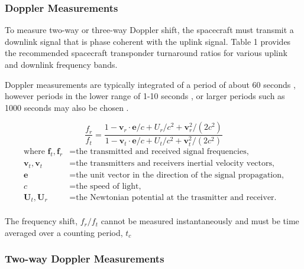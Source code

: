 \subsubsection{Doppler Measurements}

To measure two-way or three-way Doppler shift, the spacecraft must transmit a
downlink signal that is phase coherent with the uplink signal. Table 1 provides
the recommended spacecraft transponder turnaround ratios for various uplink and
downlink frequency bands.

Doppler measurements are typically integrated of a period of about 60 seconds \cite{},
however periods in the lower range of 1-10 seconds \cite{}, or larger periods such as
1000 seconds may also be chosen \cite{}.

\begin{equation}
    \frac{f_r}{f_t} = \frac{
        1-\mathbf{v}_r\cdot{}\mathbf{e}/c + U_r/c^2 +\mathbf{v}_r^2/(2c^2)
    }{
        1-\mathbf{v}_t\cdot{}\mathbf{e}/c + U_t/c^2 +\mathbf{v}_t^2/(2c^2)
    }
\end{equation}
\begin{equation*}
    \begin{aligned}
        \textrm{where  }
        \mathbf{f}_t, \mathbf{f}_r &= \textrm{the transmitted and received signal frequencies,}\\
        \mathbf{v}_t, \mathbf{v}_t &= \textrm{the transmitters and receivers inertial velocity vectors,}\\
        \mathbf{e} &= \textrm{the unit vector in the direction of the signal propagation,}\\
        c &= \textrm{the speed of light,}\\
        \mathbf{U}_t, \mathbf{U}_r &= \textrm{the Newtonian potential at the trasmitter and receiver.}\\
    \end{aligned}
\end{equation*}

The frequency shift, $f_r/f_t$ cannot be measured instantaneously and must be
time averaged over a counting period, $t_c$

\subsubsection{Two-way Doppler Measurements}

